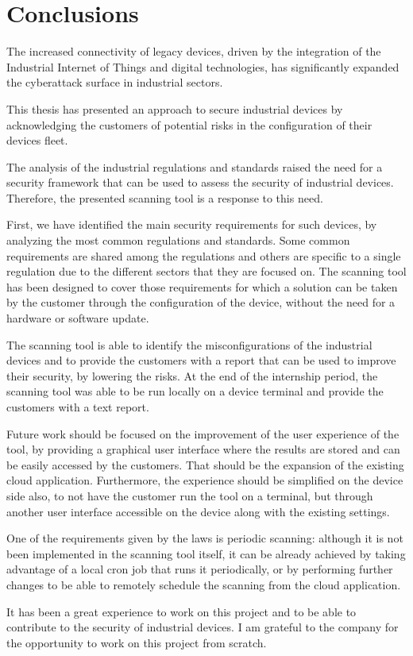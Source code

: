 \chapter{Conclusions}

The increased connectivity of legacy devices, driven by the integration of the Industrial Internet of Things and digital technologies, has significantly expanded the cyberattack surface in industrial sectors.

This thesis has presented an approach to secure industrial devices by acknowledging the customers of potential risks in the configuration of their devices fleet.

The analysis of the industrial regulations and standards raised the need for a security framework that can be used to assess the security of industrial devices. Therefore, the presented scanning tool is a response to this need.

First, we have identified the main security requirements for such devices, by analyzing the most common regulations and standards. Some common requirements are shared among the regulations and others are specific to a single regulation due to the different sectors that they are focused on. The scanning tool has been designed to cover those requirements for which a solution can be taken by the customer through the configuration of the device, without the need for a hardware or software update.

The scanning tool is able to identify the misconfigurations of the industrial devices and to provide the customers with a report that can be used to improve their security, by lowering the risks. At the end of the internship period, the scanning tool was able to be run locally on a device terminal and provide the customers with a text report.

Future work should be focused on the improvement of the user experience of the tool, by providing a graphical user interface where the results are stored and can be easily accessed by the customers. That should be the expansion of the existing cloud application. Furthermore, the experience should be simplified on the device side also, to not have the customer run the tool on a terminal, but through another user interface accessible on the device along with the existing settings.

One of the requirements given by the laws is periodic scanning: although it is not been implemented in the scanning tool itself, it can be already achieved by taking advantage of a local cron job that runs it periodically, or by performing further changes to be able to remotely schedule the scanning from the cloud application.

It has been a great experience to work on this project and to be able to contribute to the security of industrial devices. I am grateful to the company for the opportunity to work on this project from scratch.
